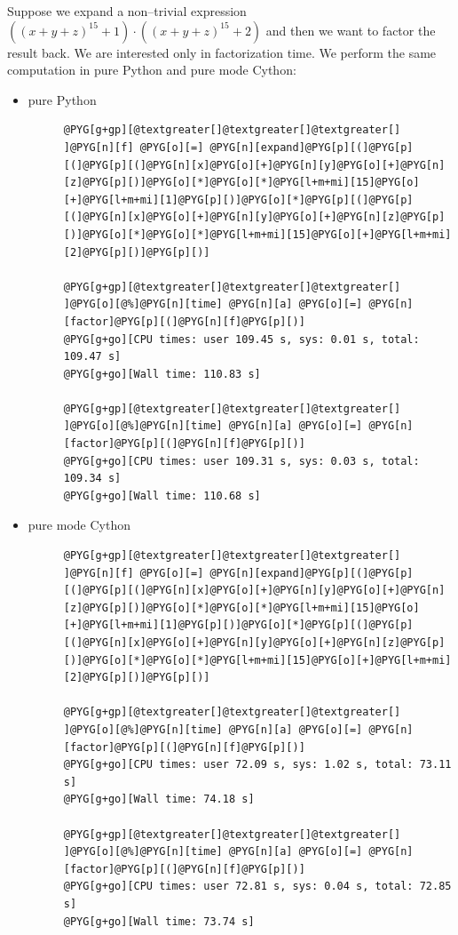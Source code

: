 Suppose we expand a non--trivial expression $((x + y + z)^{15} + 1) \cdot ((x + y + z)^{15} + 2)$ and
then we want to factor the result back. We are interested only in factorization time. We perform
the same computation in pure Python and pure mode Cython:
\begin{itemize}
\item {} \begin{description}
\item[pure Python] \leavevmode
\begin{Verbatim}[commandchars=@\[\]]
@PYG[g+gp][@textgreater[]@textgreater[]@textgreater[] ]@PYG[n][f] @PYG[o][=] @PYG[n][expand]@PYG[p][(]@PYG[p][(]@PYG[p][(]@PYG[n][x]@PYG[o][+]@PYG[n][y]@PYG[o][+]@PYG[n][z]@PYG[p][)]@PYG[o][*]@PYG[o][*]@PYG[l+m+mi][15]@PYG[o][+]@PYG[l+m+mi][1]@PYG[p][)]@PYG[o][*]@PYG[p][(]@PYG[p][(]@PYG[n][x]@PYG[o][+]@PYG[n][y]@PYG[o][+]@PYG[n][z]@PYG[p][)]@PYG[o][*]@PYG[o][*]@PYG[l+m+mi][15]@PYG[o][+]@PYG[l+m+mi][2]@PYG[p][)]@PYG[p][)]

@PYG[g+gp][@textgreater[]@textgreater[]@textgreater[] ]@PYG[o][@%]@PYG[n][time] @PYG[n][a] @PYG[o][=] @PYG[n][factor]@PYG[p][(]@PYG[n][f]@PYG[p][)]
@PYG[g+go][CPU times: user 109.45 s, sys: 0.01 s, total: 109.47 s]
@PYG[g+go][Wall time: 110.83 s]

@PYG[g+gp][@textgreater[]@textgreater[]@textgreater[] ]@PYG[o][@%]@PYG[n][time] @PYG[n][a] @PYG[o][=] @PYG[n][factor]@PYG[p][(]@PYG[n][f]@PYG[p][)]
@PYG[g+go][CPU times: user 109.31 s, sys: 0.03 s, total: 109.34 s]
@PYG[g+go][Wall time: 110.68 s]
\end{Verbatim}
\noindent
\end{description}

\item {} \begin{description}
\item[pure mode Cython] \leavevmode
\begin{Verbatim}[commandchars=@\[\]]
@PYG[g+gp][@textgreater[]@textgreater[]@textgreater[] ]@PYG[n][f] @PYG[o][=] @PYG[n][expand]@PYG[p][(]@PYG[p][(]@PYG[p][(]@PYG[n][x]@PYG[o][+]@PYG[n][y]@PYG[o][+]@PYG[n][z]@PYG[p][)]@PYG[o][*]@PYG[o][*]@PYG[l+m+mi][15]@PYG[o][+]@PYG[l+m+mi][1]@PYG[p][)]@PYG[o][*]@PYG[p][(]@PYG[p][(]@PYG[n][x]@PYG[o][+]@PYG[n][y]@PYG[o][+]@PYG[n][z]@PYG[p][)]@PYG[o][*]@PYG[o][*]@PYG[l+m+mi][15]@PYG[o][+]@PYG[l+m+mi][2]@PYG[p][)]@PYG[p][)]

@PYG[g+gp][@textgreater[]@textgreater[]@textgreater[] ]@PYG[o][@%]@PYG[n][time] @PYG[n][a] @PYG[o][=] @PYG[n][factor]@PYG[p][(]@PYG[n][f]@PYG[p][)]
@PYG[g+go][CPU times: user 72.09 s, sys: 1.02 s, total: 73.11 s]
@PYG[g+go][Wall time: 74.18 s]

@PYG[g+gp][@textgreater[]@textgreater[]@textgreater[] ]@PYG[o][@%]@PYG[n][time] @PYG[n][a] @PYG[o][=] @PYG[n][factor]@PYG[p][(]@PYG[n][f]@PYG[p][)]
@PYG[g+go][CPU times: user 72.81 s, sys: 0.04 s, total: 72.85 s]
@PYG[g+go][Wall time: 73.74 s]
\end{Verbatim}
\noindent
\end{description}

\end{itemize}

